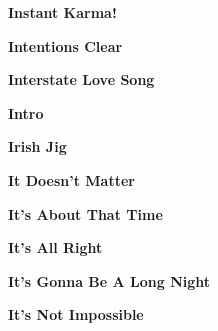\begin{center}\textbf{Instant Karma!}\end{center}
\newline
\vspace{10pt} 
\begin{center}\textbf{Intentions Clear}\end{center}
\newline
\vspace{10pt} 
\begin{center}\textbf{Interstate Love Song}\end{center}
\newline
\vspace{10pt} 
\begin{center}\textbf{Intro}\end{center}
\newline
\vspace{10pt} 
\begin{center}\textbf{Irish Jig}\end{center}
\newline
\vspace{10pt} 
\begin{center}\textbf{It Doesn't Matter}\end{center}
\newline
\vspace{10pt} 
\begin{center}\textbf{It's About That Time}\end{center}
\newline
\vspace{10pt} 
\begin{center}\textbf{It's All Right}\end{center}
\newline
\vspace{10pt} 
\begin{center}\textbf{It's Gonna Be A Long Night}\end{center}
\newline
\vspace{10pt} 
\begin{center}\textbf{It's Not Impossible}\end{center}
